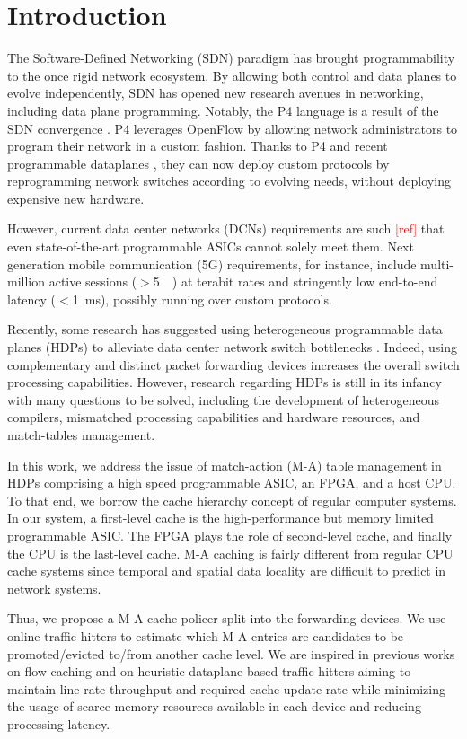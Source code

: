\section{Introduction}\label{sec:intro}

The Software-Defined Networking (SDN) paradigm has brought programmability to the once rigid network ecosystem. By allowing both control and data planes to evolve independently, SDN has opened new research avenues in networking, including data plane programming. Notably, the P4 language is a result of the SDN convergence \cite{Bosshart:14}. P4 leverages OpenFlow by allowing network administrators to program their network in a custom fashion. Thanks to P4 and recent programmable dataplanes \cite{Bosshart:13}, they can now deploy custom protocols by reprogramming network switches according to evolving needs, without deploying expensive new hardware. 


However, current data center networks (DCNs) requirements are such \textcolor{red}{[ref]} that even state-of-the-art programmable ASICs \cite{tofino:18} cannot solely meet them. Next generation mobile communication (5G) requirements, for instance, include multi-million active sessions ($>$\SI{5}{\mega\nothing}) at terabit rates and stringently low end-to-end latency ($<$\SI{1}{\milli\second}), possibly running over custom protocols.

Recently, some research has suggested using heterogeneous programmable data planes (HDPs) to alleviate data center network switch bottlenecks \cite{p4eu:18}. Indeed, using complementary and distinct packet forwarding devices increases the overall switch processing capabilities. However, research regarding HDPs is still in its infancy with many questions to be solved, including the development of heterogeneous compilers, mismatched processing capabilities and hardware resources, and match-tables management.

In this work, we address the issue of match-action (M-A) table management in HDPs comprising a high speed programmable ASIC, an FPGA, and a host CPU. To that end, we borrow the cache hierarchy concept of regular computer systems. In our system, a first-level cache is the high-performance but memory limited programmable ASIC. The FPGA plays the role of second-level cache, and finally the CPU is the last-level cache. M-A caching is fairly different from regular CPU cache systems since temporal and spatial data locality are difficult to predict in network systems. 

Thus, we propose a M-A cache policer split into the forwarding devices. We use online traffic hitters to estimate which M-A entries are candidates to be promoted/evicted to/from another cache level. We are inspired in previous works on flow caching \cite{casado:2008,Katta:2014,Pfaff:15} and on heuristic dataplane-based traffic hitters \cite{Sivaraman:17} aiming to maintain line-rate throughput and required cache update rate while minimizing the usage of scarce memory resources available in each device and reducing processing latency.

